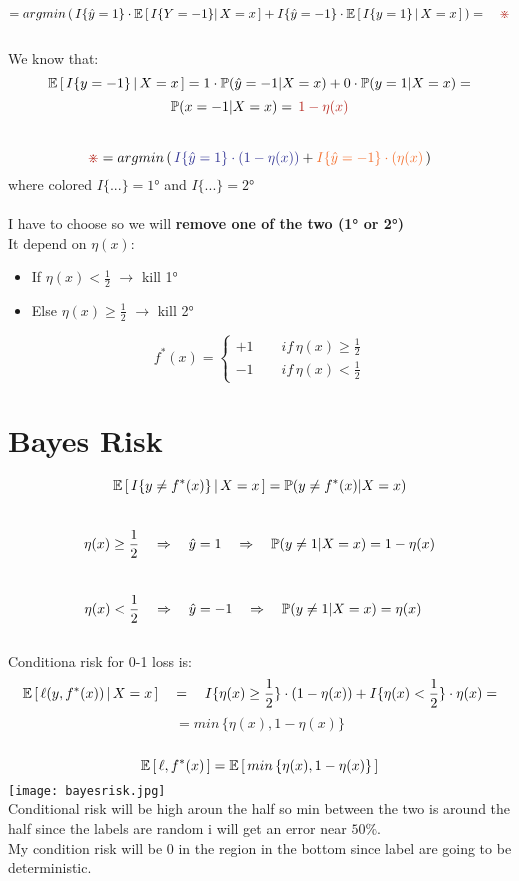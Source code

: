 \documentclass[../main.tex]{subfiles}
\begin{document}
\\
$$
= argmin \, (  \, I\{\hat{y} = 1\} \cdot \barra{E} \left[ \, I\{Y=-1\} |\, X = x\, \right] + I\{\hat{y}=-1\} \cdot \barra{E} \left[ \, I\{y=1\} \, | \, X = x \, \right] \, ) =  \quad \red{\divideontimes}
$$\\
We know that: $$ \mathbb{E} \left[ \, I \{y = -1 \} \, | \, X = x \, \right] = 1 \cdot \mathbb{P} \\ (\hat{y} = -1 | X = x ) + 0 \cdot \mathbb{P} (y = 1 | X= x) =  
$$
$$
\barra{P} (x = -1 | X=x ) = \, \red{ 1- \eta(x) }
$$\\
$$
 \red{\divideontimes} =   argmin \, (  \, \col{I\{\hat{y} = 1\} \cdot (1 - \eta(x))}{Blue} + \col{I \{ \hat{y} = -1\} \cdot (\eta(x)}{Orange} \, )
$$
where  colored $I \{...\} = 1$° and  $I \{...\} = 2$°
\\\\
I have to choose  so we will \textbf{remove one of the two (1° or 2°) }
\\
It depend on $\eta(x)$:
\begin{itemize}
\item  If $\eta(x) < \frac{1}{2}$ \quad $\longrightarrow$ \quad kill 1°
\item  Else $\eta(x) \geq \frac{1}{2}$ \quad $\longrightarrow$ \quad kill 2°
\end{itemize}
$$
f^*(x) = 
\begin{cases}
+1 \qquad if \, \eta(x) \geq \frac{1}{2}\\
-1 \qquad if \, \eta(x) < \frac{1}{2}
\end{cases}
$$
\section{Bayes Risk}

$$
\mathbb{E} \left[ \, I \{ y \neq f^*(x) \}\, | \, X = x \, \right] = \mathbb{P}(y \neq f^*(x)|X= x)
$$\
$$
\eta(x) \geq \frac{1}{2} \quad \Rightarrow \quad \hat{y} = 1  \quad \Rightarrow \quad  \mathbb{P} (y \neq 1 | X= x) = 1-\eta(x)
$$\
$$
\eta(x) < \frac{1}{2} \quad \Rightarrow \quad \hat{y} = -1  \quad \Rightarrow \quad  \mathbb{P} (y \neq 1 | X= x) = \eta(x) \quad
$$
\\
Conditiona risk for 0-1 loss is:
\\
$$
\mathbb{E} \left[ \, \ell (y, f^*(x)) \, | \, X = x \, \right] 
\quad = \quad I \{ \eta(x) \geq \frac{1}{2}\} \cdot(1-\eta(x)) + I \{ \eta(x) <\frac{1}{2}\} \cdot \eta(x) = 
$$
$$
 = min \, \{ \eta(x), 1- \eta(x) \}
$$\
$$
\mathbb{E} \left[ \, \ell , f^*(x) \, \right] = \mathbb{E} \left[ \, min \, \{ \eta(x) , 1- \eta(x) \} \, \right] 
$$
\texttt{[image: bayesrisk.jpg]}
\\
Conditional risk will be high aroun the half so min between the two is around
the half since the labels are random i will get an error near $50\%$.\\
My condition risk will be 0 in the region in the bottom since label are going to
be deterministic.
\end{document}
